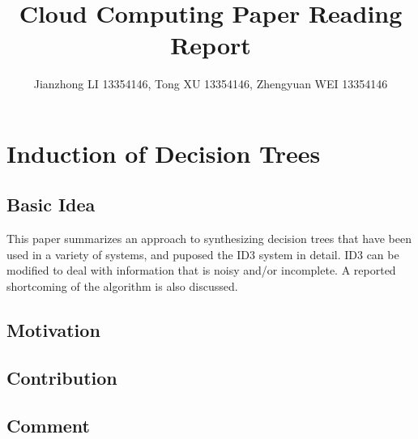 \documentclass[a4paper]{article}
\title{Cloud Computing Paper Reading Report}
\author{Jianzhong LI 13354146, Tong XU 13354146, Zhengyuan WEI 13354146}
\begin{document}
    \maketitle
    \section{Induction of Decision Trees}
        \subsection{Basic Idea}
            This paper summarizes an approach to synthesizing decision trees that have been used in a variety of systems, and puposed the ID3 system in detail. ID3 can be modified to deal with information that is noisy and/or incomplete. A reported shortcoming of the algorithm is also discussed.

        \subsection{Motivation}
       
        \subsection{Contribution}
        
        \subsection{Comment}
        
\end{document}
